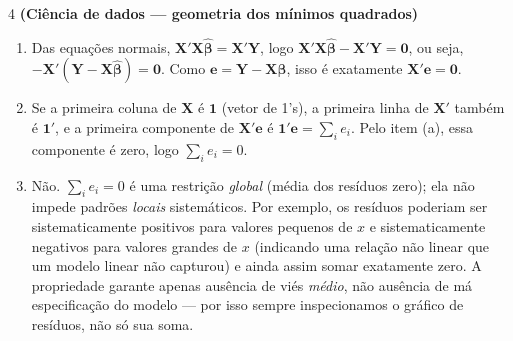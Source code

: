 \documentclass[11pt]{article}
\begin{document}
\begin{questao}{4} \textbf{(Ciência de dados --- geometria dos mínimos quadrados)}
\end{questao}
\begin{solucao}
\begin{enumerate}[label=(\alph*)]
  \item Das equações normais, $\mathbf{X}'\mathbf{X}\hat{\boldsymbol\beta} = \mathbf{X}'\mathbf{Y}$,
    logo $\mathbf{X}'\mathbf{X}\hat{\boldsymbol\beta} - \mathbf{X}'\mathbf{Y} = \mathbf{0}$, ou
    seja, $-\mathbf{X}'(\mathbf{Y} - \mathbf{X}\hat{\boldsymbol\beta}) = \mathbf{0}$. Como
    $\mathbf{e} = \mathbf{Y}-\mathbf{X}\hat{\boldsymbol\beta}$, isso é exatamente
    $\mathbf{X}'\mathbf{e} = \mathbf{0}$.
  \item Se a primeira coluna de $\mathbf{X}$ é $\mathbf{1}$ (vetor de 1's), a primeira linha de
    $\mathbf{X}'$ também é $\mathbf{1}'$, e a primeira componente de $\mathbf{X}'\mathbf{e}$ é
    $\mathbf{1}'\mathbf{e} = \sum_i e_i$. Pelo item (a), essa componente é zero, logo $\sum_i e_i
    = 0$.
  \item Não. $\sum_i e_i = 0$ é uma restrição \emph{global} (média dos resíduos zero); ela não
    impede padrões \emph{locais} sistemáticos. Por exemplo, os resíduos poderiam ser
    sistematicamente positivos para valores pequenos de $x$ e sistematicamente negativos para
    valores grandes de $x$ (indicando uma relação não linear que um modelo linear não capturou) e
    ainda assim somar exatamente zero. A propriedade garante apenas ausência de viés
    \emph{médio}, não ausência de má especificação do modelo --- por isso sempre inspecionamos o
    gráfico de resíduos, não só sua soma.
\end{enumerate}
\end{solucao}
\end{document}
